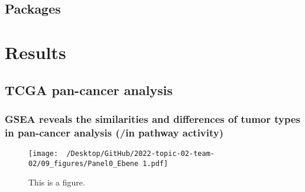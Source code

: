 \documentclass[
  parskip,
  oneside]{scrreprt}
\begin{document}
\hypertarget{packages}{%
\section{Packages}\label{packages}}

\hypertarget{results}{%
\chapter{Results}\label{results}}

\hypertarget{tcga-pan-cancer-analysis-1}{%
\section{TCGA pan-cancer analysis}\label{tcga-pan-cancer-analysis-1}}

\hypertarget{gsea-reveals-the-similarities-and-differences-of-tumor-types-in-pan-cancer-analysis-in-pathway-activity}{%
\subsection{GSEA reveals the similarities and differences of tumor types
in pan-cancer analysis (/in pathway
activity)}\label{gsea-reveals-the-similarities-and-differences-of-tumor-types-in-pan-cancer-analysis-in-pathway-activity}}

\begin{figure}
  \texttt{[image: ~/Desktop/GitHub/2022-topic-02-team-02/09\_figures/Panel0\_Ebene 1.pdf]}
  \caption{This is a figure.}
\end{figure}
\end{document}
